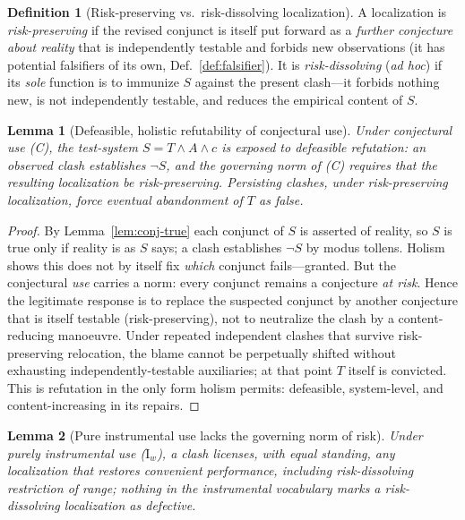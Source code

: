 \documentclass{amsart}
\theoremstyle{definition}
\newtheorem{definition}{Definition}
\theoremstyle{plain}
\newtheorem{lemma}{Lemma}
\begin{document}
\begin{definition}[Risk-preserving vs.\ risk-dissolving
localization]\label{def:adhoc}
A localization is \emph{risk-preserving} if the revised conjunct is itself put
forward as a \emph{further conjecture about reality} that is independently
testable and forbids new observations (it has potential falsifiers of its own,
Def.~\ref{def:falsifier}). It is \emph{risk-dissolving} (\emph{ad hoc}) if its
\emph{sole} function is to immunize $S$ against the present clash---it forbids
nothing new, is not independently testable, and reduces the empirical content
of $S$.
\end{definition}

\begin{lemma}[Defeasible, holistic refutability of conjectural use]\label{lem:conj-refute}
Under conjectural use (C), the test-system $S=T\wedge A\wedge c$ is exposed to
\emph{defeasible} refutation: an observed clash establishes $\neg S$, and the
governing norm of (C) requires that the resulting localization be
\emph{risk-preserving}. Persisting clashes, under risk-preserving
localization, force eventual abandonment of $T$ as false.
\end{lemma}

\begin{proof}
By Lemma~\ref{lem:conj-true} each conjunct of $S$ is asserted of reality, so
$S$ is true only if reality is as $S$ says; a clash establishes $\neg S$ by
modus tollens. Holism shows this does not by itself fix \emph{which} conjunct
fails---granted. But the conjectural \emph{use} carries a norm: every conjunct
remains a conjecture \emph{at risk}. Hence the legitimate response is to replace
the suspected conjunct by another conjecture that is itself testable
(risk-preserving), not to neutralize the clash by a content-reducing manoeuvre.
Under repeated independent clashes that survive risk-preserving relocation, the
blame cannot be perpetually shifted without exhausting independently-testable
auxiliaries; at that point $T$ itself is convicted. This is refutation in the
only form holism permits: defeasible, system-level, and content-increasing in
its repairs.
\end{proof}

\begin{lemma}[Pure instrumental use lacks the governing norm of
risk]\label{lem:instr-norefute}
Under purely instrumental use ($\mathrm I_w$), a clash licenses, with equal
standing, \emph{any} localization that restores convenient performance,
including \emph{risk-dissolving} restriction of range; nothing in the
instrumental vocabulary marks a risk-dissolving localization as defective.
\end{lemma}
\end{document}
